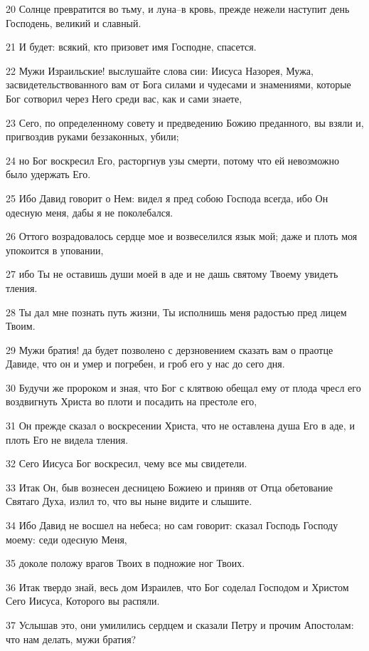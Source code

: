 \par 20 Солнце превратится во тьму, и луна--в кровь, прежде нежели наступит день Господень, великий и славный.
\par 21 И будет: всякий, кто призовет имя Господне, спасется.
\par 22 Мужи Израильские! выслушайте слова сии: Иисуса Назорея, Мужа, засвидетельствованного вам от Бога силами и чудесами и знамениями, которые Бог сотворил через Него среди вас, как и сами знаете,
\par 23 Сего, по определенному совету и предведению Божию преданного, вы взяли и, пригвоздив руками беззаконных, убили;
\par 24 но Бог воскресил Его, расторгнув узы смерти, потому что ей невозможно было удержать Его.
\par 25 Ибо Давид говорит о Нем: видел я пред собою Господа всегда, ибо Он одесную меня, дабы я не поколебался.
\par 26 Оттого возрадовалось сердце мое и возвеселился язык мой; даже и плоть моя упокоится в уповании,
\par 27 ибо Ты не оставишь души моей в аде и не дашь святому Твоему увидеть тления.
\par 28 Ты дал мне познать путь жизни, Ты исполнишь меня радостью пред лицем Твоим.
\par 29 Мужи братия! да будет позволено с дерзновением сказать вам о праотце Давиде, что он и умер и погребен, и гроб его у нас до сего дня.
\par 30 Будучи же пророком и зная, что Бог с клятвою обещал ему от плода чресл его воздвигнуть Христа во плоти и посадить на престоле его,
\par 31 Он прежде сказал о воскресении Христа, что не оставлена душа Его в аде, и плоть Его не видела тления.
\par 32 Сего Иисуса Бог воскресил, чему все мы свидетели.
\par 33 Итак Он, быв вознесен десницею Божиею и приняв от Отца обетование Святаго Духа, излил то, что вы ныне видите и слышите.
\par 34 Ибо Давид не восшел на небеса; но сам говорит: сказал Господь Господу моему: седи одесную Меня,
\par 35 доколе положу врагов Твоих в подножие ног Твоих.
\par 36 Итак твердо знай, весь дом Израилев, что Бог соделал Господом и Христом Сего Иисуса, Которого вы распяли.
\par 37 Услышав это, они умилились сердцем и сказали Петру и прочим Апостолам: что нам делать, мужи братия?
